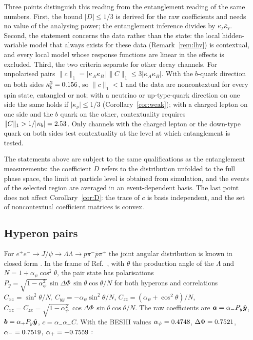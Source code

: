 Three points distinguish this reading from the entanglement reading of the same numbers. First, the bound $|D|\le1/3$ is derived for the raw coefficients and needs no value of the analysing power; the entanglement inference divides by $\kappa_\ell\bar\kappa_\ell$. Second, the statement concerns the data rather than the state: the local hidden-variable model that always exists for these data (Remark~\ref{rem:lhv}) is contextual, and every local model whose response functions are linear in the effects is excluded. Third, the two criteria separate for other decay channels. For unpolarised pairs $\|c\|_1=|\kappa_A\kappa_B|\,\|C\|_1\le3|\kappa_A\kappa_B|$. With the $b$-quark direction on both sides $\kappa_b^2=0.156$, so $\|c\|_1<1$ and the data are noncontextual for every spin state, entangled or not; with a neutrino or up-type-quark direction on one side the same holds if $|\kappa_\nu|\le1/3$ (Corollary~\ref{cor:weak}); with a charged lepton on one side and the $b$ quark on the other, contextuality requires $\|C\|_1>1/|\kappa_b|=2.53$. Only channels with the charged lepton or the down-type quark on both sides test contextuality at the level at which entanglement is tested.

The statements above are subject to the same qualifications as the entanglement measurements: the coefficient $D$ refers to the distribution unfolded to the full phase space, the limit at particle level is obtained from simulation, and the events of the selected region are averaged in an event-dependent basis. The last point does not affect Corollary~\ref{cor:D}: the trace of $c$ is basis independent, and the set of noncontextual coefficient matrices is convex.

\subsection{Hyperon pairs}

For $e^+e^-\to J/\psi\to\Lambda\bar\Lambda\to p\pi^-\bar p\pi^+$ the joint angular distribution is known in closed form \cite{faldt2017}. In the frame of Ref.~\cite{faldt2017}, with $\theta$ the production angle of the $\Lambda$ and $N=1+\alpha_\psi\cos^2\theta$, the pair state has polarisations $P_y=\sqrt{1-\alpha_\psi^2}\,\sin\Delta\Phi\,\sin\theta\cos\theta/N$ for both hyperons and correlations $C_{xx}=\sin^2\theta/N$, $C_{yy}=-\alpha_\psi\sin^2\theta/N$, $C_{zz}=(\alpha_\psi+\cos^2\theta)/N$, $C_{xz}=C_{zx}=\sqrt{1-\alpha_\psi^2}\,\cos\Delta\Phi\,\sin\theta\cos\theta/N$. The raw coefficients are $\bm{a}=\alpha_-P_y\hat{\bm y}$, $\bm{b}=\alpha_+P_y\hat{\bm y}$, $c=\alpha_-\alpha_+C$. With the BESIII values $\alpha_\psi=0.4748$, $\Delta\Phi=0.7521$, $\alpha_-=0.7519$, $\alpha_+=-0.7559$ \cite{besiii2022}:

